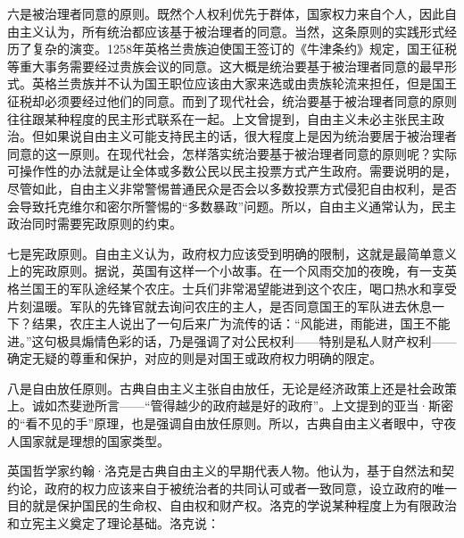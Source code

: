 六是被治理者同意的原则。既然个人权利优先于群体，国家权力来自个人，因此自由主义认为，所有统治都应该基于被治理者的同意。当然，这条原则的实践形式经历了复杂的演变。1258年英格兰贵族迫使国王签订的《牛津条约》规定，国王征税等重大事务需要经过贵族会议的同意。这大概是统治要基于被治理者同意的最早形式。英格兰贵族并不认为国王职位应该由大家来选或由贵族轮流来担任，但是国王征税却必须要经过他们的同意。而到了现代社会，统治要基于被治理者同意的原则往往跟某种程度的民主形式联系在一起。上文曾提到，自由主义未必主张民主政治。但如果说自由主义可能支持民主的话，很大程度上是因为统治要居于被治理者同意的这一原则。在现代社会，怎样落实统治要基于被治理者同意的原则呢？实际可操作性的办法就是让全体或多数公民以民主投票方式产生政府。需要说明的是，尽管如此，自由主义非常警惕普通民众是否会以多数投票方式侵犯自由权利，是否会导致托克维尔和密尔所警惕的“多数暴政”问题。所以，自由主义通常认为，民主政治同时需要宪政原则的约束。

七是宪政原则。自由主义认为，政府权力应该受到明确的限制，这就是最简单意义上的宪政原则。据说，英国有这样一个小故事。在一个风雨交加的夜晚，有一支英格兰国王的军队途经某个农庄。士兵们非常渴望能进到这个农庄，喝口热水和享受片刻温暖。军队的先锋官就去询问农庄的主人，是否同意国王的军队进去休息一下？结果，农庄主人说出了一句后来广为流传的话：“风能进，雨能进，国王不能进。”这句极具煽情色彩的话，乃是强调了对公民权利——特别是私人财产权利——确定无疑的尊重和保护，对应的则是对国王或政府权力明确的限定。

八是自由放任原则。古典自由主义主张自由放任，无论是经济政策上还是社会政策上。诚如杰斐逊所言——“管得越少的政府越是好的政府”。上文提到的亚当·斯密的“看不见的手”原理，也是强调自由放任原则。所以，古典自由主义者眼中，守夜人国家就是理想的国家类型。


英国哲学家约翰·洛克是古典自由主义的早期代表人物。他认为，基于自然法和契约论，政府的权力应该来自于被统治者的共同认可或者一致同意，设立政府的唯一目的就是保护国民的生命权、自由权和财产权。洛克的学说某种程度上为有限政治和立宪主义奠定了理论基础。洛克说：


